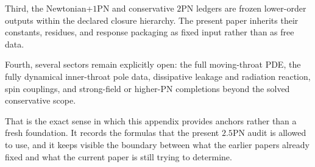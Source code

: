 \documentclass[11pt]{article}
\begin{document}
Third, the Newtonian+$1$PN and conservative $2$PN ledgers are frozen lower-order outputs
within the declared closure hierarchy.  The present paper inherits their constants,
residues, and response packaging as fixed input rather than as free data.

Fourth, several sectors remain explicitly open: the full moving-throat PDE, the fully
dynamical inner-throat pole data, dissipative leakage and radiation reaction, spin
couplings, and strong-field or higher-PN completions beyond the solved conservative
scope.

That is the exact sense in which this appendix provides anchors rather than a fresh
foundation.  It records the formulas that the present $2.5$PN audit is allowed to use, and
it keeps visible the boundary between what the earlier papers already fixed and what the
current paper is still trying to determine.
\end{document}
